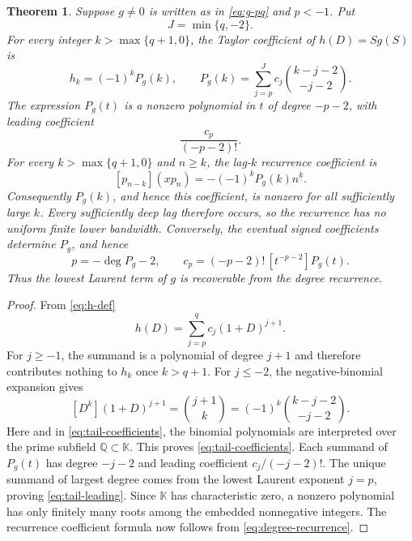 \documentclass[11pt,reqno]{amsart}
\numberwithin{equation}{section}
\newtheorem{theorem}{Theorem}[section]
\theoremstyle{definition}
\theoremstyle{remark}
\newcommand{\K}{\mathbb K}
\newcommand{\fall}[2]{#1^{\underline{#2}}}
\begin{document}
\begin{theorem}\label{thm:tail}
Suppose $g\ne0$ is written as in \eqref{eq:g-pq} and $p<-1$.  Put
\[
 J=\min\{q,-2\}.
\]
For every integer $k>\max\{q+1,0\}$, the Taylor coefficient of $h(D)=Sg(S)$ is
\begin{equation}\label{eq:tail-coefficients}
 h_k=(-1)^kP_g(k),
 \qquad
 P_g(k)=\sum_{j=p}^{J}c_j
 \binom{k-j-2}{-j-2}.
\end{equation}
The expression $P_g(t)$ is a nonzero polynomial in $t$ of degree $-p-2$, with leading coefficient
\begin{equation}\label{eq:tail-leading}
 \frac{c_p}{(-p-2)!}.
\end{equation}
For every $k>\max\{q+1,0\}$ and $n\ge k$, the lag-$k$ recurrence coefficient is
\begin{equation}\label{eq:tail-recurrence-coefficient}
 [p_{n-k}](xp_n)=-(-1)^kP_g(k)\fall{n}{k}.
\end{equation}
Consequently $P_g(k)$, and hence this coefficient, is nonzero for all sufficiently large $k$.  Every sufficiently deep lag therefore occurs, so the recurrence has no uniform finite lower bandwidth.  Conversely, the eventual signed coefficients determine $P_g$, and hence
\[
 p=-\deg P_g-2,
 \qquad
 c_p=(-p-2)!\,[t^{-p-2}]P_g(t).
\]
Thus the lowest Laurent term of $g$ is recoverable from the degree recurrence.
\end{theorem}

\begin{proof}
From \eqref{eq:h-def}
\[
 h(D)=\sum_{j=p}^{q}c_j(1+D)^{j+1}.
\]
For $j\ge-1$, the summand is a polynomial of degree $j+1$ and therefore contributes nothing to $h_k$ once $k>q+1$.  For $j\le-2$, the negative-binomial expansion gives
\[
 [D^k](1+D)^{j+1}
 =\binom{j+1}{k}
 =(-1)^k\binom{k-j-2}{-j-2}.
\]
Here and in \eqref{eq:tail-coefficients}, the binomial polynomials are interpreted over the prime subfield $\mathbb Q\subset\K$.  This proves \eqref{eq:tail-coefficients}.  Each summand of $P_g(t)$ has degree $-j-2$ and leading coefficient $c_j/(-j-2)!$.  The unique summand of largest degree comes from the lowest Laurent exponent $j=p$, proving \eqref{eq:tail-leading}.  Since $\K$ has characteristic zero, a nonzero polynomial has only finitely many roots among the embedded nonnegative integers.  The recurrence coefficient formula now follows from \eqref{eq:degree-recurrence}.
\end{proof}
\end{document}
